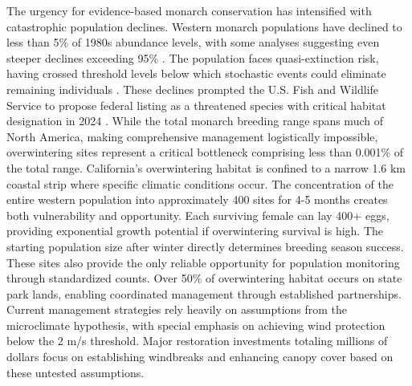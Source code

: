 The urgency for evidence-based monarch conservation has intensified with catastrophic population declines. Western monarch populations have declined to less than 5\% of 1980s abundance levels, with some analyses suggesting even steeper declines exceeding 95\% \citep{peltonWesternMonarchPopulation2019}. The population faces quasi-extinction risk, having crossed threshold levels below which stochastic events could eliminate remaining individuals \citep{schultzCitizenScienceData2017}. These declines prompted the U.S. Fish and Wildlife Service to propose federal listing as a threatened species with critical habitat designation in 2024 \citep{usfishEndangeredThreatenedWildlife2024}. While the total monarch breeding range spans much of North America, making comprehensive management logistically impossible, overwintering sites represent a critical bottleneck comprising less than 0.001\% of the total range. California's overwintering habitat is confined to a narrow 1.6 km coastal strip where specific climatic conditions occur. The concentration of the entire western population into approximately 400 sites for 4-5 months creates both vulnerability and opportunity. Each surviving female can lay 400+ eggs, providing exponential growth potential if overwintering survival is high. The starting population size after winter directly determines breeding season success. These sites also provide the only reliable opportunity for population monitoring through standardized counts. Over 50\% of overwintering habitat occurs on state park lands, enabling coordinated management through established partnerships. Current management strategies rely heavily on assumptions from the microclimate hypothesis, with special emphasis on achieving wind protection below the 2 m/s threshold. Major restoration investments totaling millions of dollars focus on establishing windbreaks and enhancing canopy cover based on these untested assumptions.

